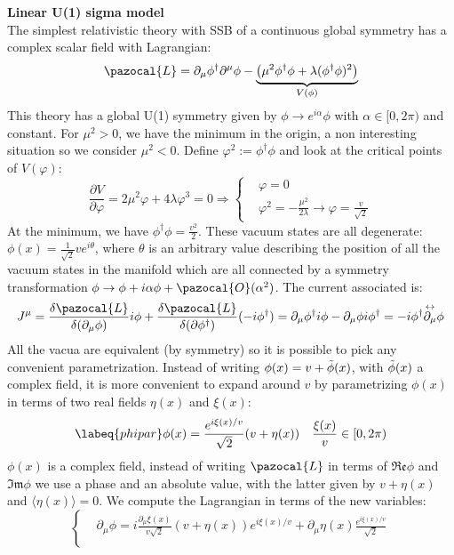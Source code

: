 \documentclass[../main.tex]{subfiles}
\begin{document}
\begin{example}
\textbf{Linear U(1) sigma model}\\
The simplest relativistic theory with SSB of a continuous global symmetry has a complex scalar field with Lagrangian:
\[
\pazocal{L}=\partial_\mu\phi^\dagger\partial^\mu\phi-\underbrace{\left(\mu^2\phi^\dagger\phi+\lambda(\phi^\dagger\phi)^2\right)}_{V(\phi)}
\]
This theory has a global U(1) symmetry given by $\phi\to e^{i\alpha}\phi$ with $\alpha\in[0,2\pi)$ and constant. For $\mu^2>0$, we have the minimum in the origin, a non interesting situation so we consider $\mu^2<0$. Define $\varphi^2:=\phi^\dagger\phi$ and look at the critical points of $V(\varphi)$:
\[
\frac{\partial V}{\partial\varphi}=2\mu^2\varphi+4\lambda\varphi^3=0\Rightarrow
\left\{
\begin{aligned}
&\varphi=0\\
&\varphi^2=-\frac{\mu^2}{2\lambda}\to\varphi=\frac{v}{\sqrt{2}}
\end{aligned}
\right.
\]
At the minimum, we have $\phi^\dagger\phi=\frac{v^2}{2}$. These vacuum states are all degenerate: $\phi(x)=\frac{1}{\sqrt{2}}ve^{i\theta}$, where $\theta$ is an arbitrary value describing the position of all the vacuum states in the manifold which are all connected by a symmetry transformation $\phi\to\phi+i\alpha\phi+\pazocal{O}(\alpha^2)$. The current associated is:
\[
J^\mu=\frac{\delta\pazocal{L}}{\delta(\partial_\mu\phi)}i\phi+\frac{\delta\pazocal{L}}{\delta(\partial\phi^\dagger)}(-i\phi^\dagger)=\partial_\mu\phi^\dagger i\phi-\partial_\mu\phi i\phi^\dagger=-i\phi^\dagger\overset{\leftrightarrow}{\partial_\mu}\phi
\]
All the vacua are equivalent (by symmetry) so it is possible to pick any convenient parametrization. Instead of writing $\phi(x)=v+\Tilde{\phi}(x)$, with $\Tilde{\phi}(x)$ a complex field, it is more convenient to expand around $v$ by parametrizing $\phi(x)$ in terms of two real fields $\eta(x)$ and $\xi(x)$:
\begin{equation}
\labeq{phipar}
\phi(x)=\frac{e^{i\xi(x)/v}}{\sqrt{2}}(v+\eta(x)) \quad \frac{\xi(x)}{v}\in[0,2\pi)
\end{equation}
$\phi(x)$ is a complex field, instead of writing $\pazocal{L}$ in terms of $\mathfrak{Re}\phi$ and $\mathfrak{Im}\phi$ we use a phase and an absolute value, with the latter given by $v+\eta(x)$ and $\langle\eta(x)\rangle=0$. We compute the Lagrangian in terms of the new variables:
\[
\left\{
\begin{aligned}
&\partial_\mu\phi=i\frac{\partial_\mu\xi(x)}{v\sqrt{2}}(v+\eta(x))e^{i\xi(x)/v}+\partial_\mu\eta(x)\frac{e^{i\xi(x)/v}}{\sqrt{2}}\\

\end{aligned}\]
\end{example}
\end{document}
